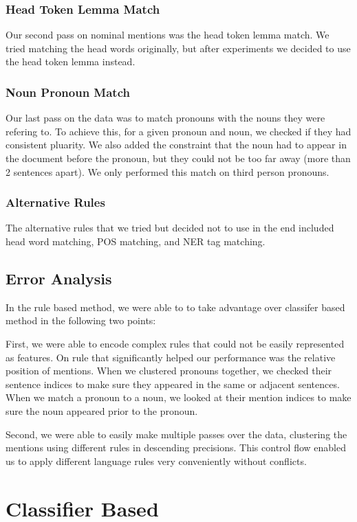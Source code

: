\documentclass[12pt, twocolumn]{article}
\begin{document}
\subsubsection{Head Token Lemma Match}
Our second pass on nominal mentions was the head token lemma match. We tried matching the head words originally, but after experiments we decided to use the head token lemma instead.

\subsubsection{Noun Pronoun Match}
Our last pass on the data was to match pronouns with the nouns they were refering to. To achieve this, for a given pronoun and noun, we checked if they had consistent pluarity. We also added the constraint that the noun had to appear in the document before the pronoun, but they could not be too far away (more than 2 sentences apart). We only performed this match on third person pronouns.

\subsubsection{Alternative Rules}
The alternative rules that we tried but decided not to use in the end included head word matching, POS matching, and NER tag matching.

\subsection{Error Analysis}
In the rule based method, we were able to to take advantage over classifer based method in the following two points:

First, we were able to encode complex rules that could not be easily represented as features. On rule that significantly helped our performance was the relative position of mentions. When we clustered pronouns together, we checked their sentence indices to make sure they appeared in the same or adjacent sentences. When we match a pronoun to a noun, we looked at their mention indices to make sure the noun appeared prior to the pronoun. 

Second, we were able to easily make multiple passes over the data, clustering the mentions using different rules in descending precisions. This control flow enabled us to apply different language rules very conveniently without conflicts.

\section{Classifier Based}
\end{document}
